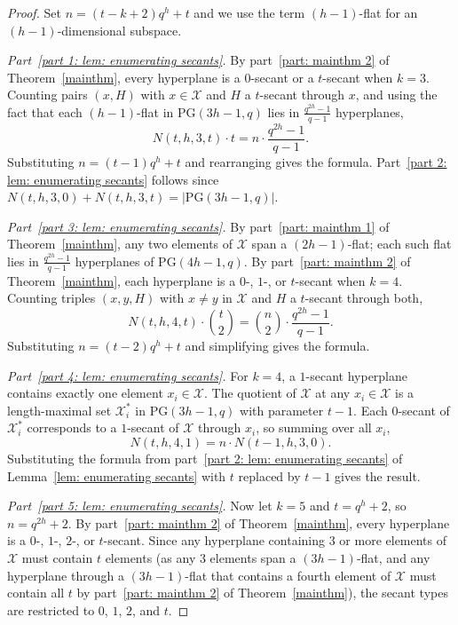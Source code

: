 \documentclass[12pt, twoside]{article}
\begin{document}
	\begin{proof}
		Set $n = (t-k+2)q^h+t$ and we use the term $(h-1)$-flat for an $(h-1)$-dimensional subspace.
		
		\medskip\noindent\textit{Part~\ref{part 1: lem: enumerating secants}.}
		By part~\ref{part: mainthm 2} of Theorem~\ref{mainthm}, every hyperplane is a $0$-secant or a $t$-secant when $k=3$. Counting pairs $(x,H)$ with $x \in \mathcal{X}$ and $H$ a $t$-secant through $x$, and using the fact that each $(h-1)$-flat in $\mathrm{PG}(3h-1,q)$ lies in $\frac{q^{2h}-1}{q-1}$ hyperplanes,
		$$
		N(t,h,3,t)\cdot t = n\cdot \frac{q^{2h}-1}{q-1}.
		$$
		Substituting $n=(t-1)q^h+t$ and rearranging gives the formula. Part~\ref{part 2: lem: enumerating secants} follows since $N(t,h,3,0)+N(t,h,3,t)=|\mathrm{PG}(3h-1,q)|$.
		
		\medskip\noindent\textit{Part~\ref{part 3: lem: enumerating secants}.}
		By part~\ref{part: mainthm 1} of Theorem~\ref{mainthm}, any two elements of $\mathcal{X}$ span a $(2h-1)$-flat; each such flat lies in $\frac{q^{2h}-1}{q-1}$ hyperplanes of $\mathrm{PG}(4h-1,q)$. By part~\ref{part: mainthm 2} of Theorem~\ref{mainthm}, each hyperplane is a $0$-, $1$-, or $t$-secant when $k=4$. Counting triples $(x,y,H)$ with $x \ne y$ in $\mathcal{X}$ and $H$ a $t$-secant through both,
		$$
		N(t,h,4,t)\cdot \binom{t}{2} = \binom{n}{2} \cdot \frac{q^{2h}-1}{q-1}.
		$$
		Substituting $n=(t-2)q^h+t$ and simplifying gives the formula.
		
		\medskip\noindent\textit{Part~\ref{part 4: lem: enumerating secants}.}
		For $k=4$, a $1$-secant hyperplane contains exactly one element $x_i \in \mathcal{X}$. The quotient of $\mathcal{X}$ at any $x_i \in \mathcal{X}$ is a length-maximal set $\mathcal{X}_i^*$ in $\mathrm{PG}(3h-1,q)$ with parameter $t-1$. Each $0$-secant of $\mathcal{X}_i^*$ corresponds to a $1$-secant of $\mathcal{X}$ through $x_i$, so summing over all $x_i$,
		$$
		N(t,h,4,1) = n \cdot N(t-1,h,3,0).
		$$
		Substituting the formula from part~\ref{part 2: lem: enumerating secants} of Lemma~\ref{lem: enumerating secants} with $t$ replaced by $t-1$ gives the result.
		
		\medskip\noindent\textit{Part~\ref{part 5: lem: enumerating secants}.}
		Now let $k=5$ and $t=q^h+2$, so $n=q^{2h}+2$. By part~\ref{part: mainthm 2} of Theorem~\ref{mainthm}, every hyperplane is a $0$-, $1$-, $2$-, or $t$-secant. Since any hyperplane containing $3$ or more elements of $\mathcal{X}$ must contain $t$ elements (as any $3$ elements span a $(3h-1)$-flat, and any hyperplane through a $(3h-1)$-flat that contains a fourth element of $\mathcal{X}$ must contain all $t$ by part~\ref{part: mainthm 2} of Theorem~\ref{mainthm}), the secant types are restricted to $0$, $1$, $2$, and $t$.
		

\end{proof}
\end{document}

